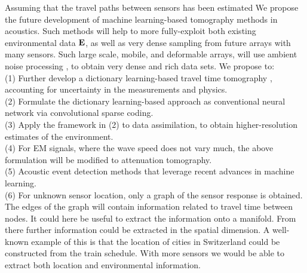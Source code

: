 Assuming that the travel paths between sensors has been estimated\cite{sabra2005,gerstoft2006} We propose the future development of machine learning-based tomography methods in acoustics. Such methods will help to more fully-exploit both existing environmental data $\bf E$, as well as very dense sampling from future arrays with many sensors. Such large scale, mobile, and deformable arrays, will use ambient noise processing \cite{sabra2005}, to obtain very dense and rich data sets. We propose  to: \\
(1) Further develop a dictionary learning-based travel time tomography \cite{bianco2018}, accounting for uncertainty in the measurements and physics. \\
(2) Formulate the dictionary learning-based approach as conventional neural network via convolutional sparse coding. \\
(3) Apply the framework in (2) to  data assimilation, to obtain higher-resolution estimates of the environment. \\
(4) For EM signals, where the wave speed does not vary much, the above formulation will be modified to  attenuation tomography.\\
(5) Acoustic event detection methods that leverage recent advances in machine learning.\\
(6) For unknown sensor location, only a graph of the sensor response is obtained. The edges of the graph will contain information related to travel time between nodes. It could here be useful to extract the information onto a manifold. From there further information could be extracted in the spatial dimension. A well-known example of this is that the location of cities in Switzerland could be constructed from the train schedule\cite{dokmanic2015}. With more sensors we would be able to extract both location and environmental information.  

